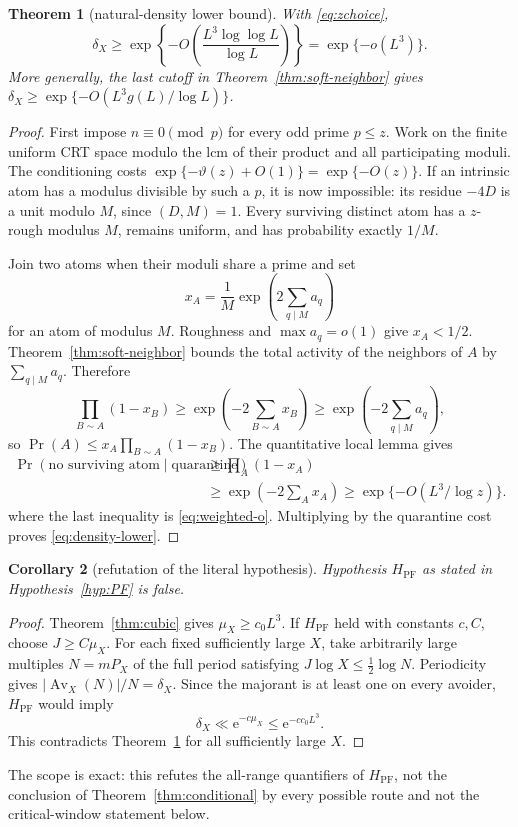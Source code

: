 \documentclass[10pt,reqno]{amsart}
\newtheorem{theorem}{Theorem}[section]
\newtheorem{corollary}[theorem]{Corollary}
\theoremstyle{definition}
\newcommand{\Av}{\operatorname {Av}}
\newcommand{\e}{\mathrm e}
\newcommand{\1}{\mathbf 1}
\newcommand{\PF}{H_{\mathrm{PF}}}
\begin{document}
\begin{theorem}[natural-density lower bound]\label{thm:density-lower}
With \eqref{eq:zchoice},
\begin{equation}\label{eq:density-lower}
 \delta_X\geq
 \exp\!\left\{-O\!\left(\frac{L^3\log\log L}{\log L}\right)\right\}
 =\exp\{-o(L^3)\}.
\end{equation}
More generally, the last cutoff in Theorem~\ref{thm:soft-neighbor} gives
$\delta_X\geq\exp\{-O(L^3g(L)/\log L)\}$.
\end{theorem}
\begin{proof}
First impose $n\equiv0\pmod p$ for every odd prime $p\leq z$.  Work on the finite uniform CRT space modulo the lcm of their product and all participating moduli.  The conditioning costs
$\exp\{-\vartheta(z)+O(1)\}=\exp\{-O(z)\}$.  If an intrinsic atom has a modulus divisible by such a $p$, it is now impossible: its residue $-4D$ is a unit modulo $M$, since $(D,M)=1$.  Every surviving distinct atom has a $z$-rough modulus $M$, remains uniform, and has probability exactly $1/M$.

Join two atoms when their moduli share a prime and set
\[
 x_A=\frac1M\exp\!\left(2\sum_{q\mid M}a_q\right)
\]
for an atom of modulus $M$.  Roughness and $\max a_q=o(1)$ give $x_A<1/2$.  Theorem~\ref{thm:soft-neighbor} bounds the total activity of the neighbors of $A$ by $\sum_{q\mid M}a_q$.  Therefore
\[
 \prod_{B\sim A}(1-x_B)
 \geq\exp\!\left(-2\sum_{B\sim A}x_B\right)
 \geq\exp\!\left(-2\sum_{q\mid M}a_q\right),
\]
so $\Pr(A)\leq x_A\prod_{B\sim A}(1-x_B)$.  The quantitative local lemma gives
\[
 \begin{aligned}
 \Pr(\text{no surviving atom}\mid\text{quarantine})
 &\geq\prod_A(1-x_A)\\
 &\geq\exp\!\left(-2\sum_Ax_A\right)
 \geq\exp\{-O(L^3/\log z)\}.
 \end{aligned}
\]
where the last inequality is \eqref{eq:weighted-o}.  Multiplying by the quarantine cost proves \eqref{eq:density-lower}.
\end{proof}

\begin{corollary}[refutation of the literal hypothesis]\label{cor:refute}
Hypothesis $\PF$ as stated in Hypothesis~\ref{hyp:PF} is false.
\end{corollary}
\begin{proof}
Theorem~\ref{thm:cubic} gives $\mu_X\geq c_0L^3$.  If $\PF$ held with constants $c,C$, choose $J\geq C\mu_X$.  For each fixed sufficiently large $X$, take arbitrarily large multiples $N=mP_X$ of the full period satisfying
$J\log X\leq\tfrac12\log N$.  Periodicity gives
$|\Av_X(N)|/N=\delta_X$.  Since the majorant is at least one on every avoider, $\PF$ would imply
\[
 \delta_X\ll\e^{-c\mu_X}\leq\e^{-cc_0L^3}.
\]
This contradicts Theorem~\ref{thm:density-lower} for all sufficiently large $X$.
\end{proof}
The scope is exact: this refutes the all-range quantifiers of $\PF$, not the conclusion of Theorem~\ref{thm:conditional} by every possible route and not the critical-window statement below.
\end{document}
